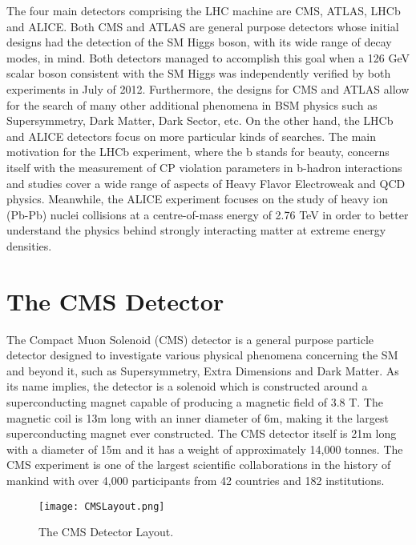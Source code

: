 The four main detectors comprising the LHC machine are CMS, ATLAS\cite{ATLAS}, LHCb\cite{LHCb} and ALICE\cite{ALICE}. Both CMS and ATLAS are general purpose detectors whose initial designs had the detection of the SM Higgs boson, with its wide range of decay modes, in mind. Both detectors managed to accomplish this goal when a 126 GeV scalar boson consistent with the SM Higgs was independently verified by both experiments in July of 2012. Furthermore, the designs for CMS and ATLAS allow for the search of many other additional phenomena in BSM physics such as Supersymmetry, Dark Matter\cite{DM}, Dark Sector\cite{DS}, etc. On the other hand, the LHCb and ALICE detectors focus on more particular kinds of searches. The main motivation for the LHCb experiment, where the b stands for beauty, concerns itself with the measurement of CP violation parameters in b-hadron interactions and studies cover a wide range of aspects of Heavy Flavor Electroweak and QCD physics. Meanwhile, the ALICE experiment focuses on the study of heavy ion (Pb-Pb) nuclei collisions at a centre-of-mass energy of 2.76 TeV in order to better understand the physics behind strongly interacting matter at extreme energy densities.

\section{The CMS Detector}
The Compact Muon Solenoid (CMS) detector is a general purpose particle detector designed to investigate various physical phenomena concerning the SM and beyond it, such as Supersymmetry, Extra Dimensions and Dark Matter. As its name implies, the detector is a solenoid which is constructed around a superconducting magnet capable of producing a magnetic field of 3.8 T. The magnetic coil is 13m long with an inner diameter of 6m, making it the largest superconducting magnet ever constructed. The CMS detector itself is 21m long with a diameter of 15m and it has a weight of approximately 14,000 tonnes. The CMS experiment is one of the largest scientific collaborations in the history of mankind with over 4,000 participants from 42 countries and 182 institutions.\\

\begin{figure}[tb]
\texttt{[image: CMSLayout.png]} 
\caption{The CMS Detector Layout\cite{CMSlayout}.}
\label{CMSLayout} 
\hspace{4em}
\end{figure}

